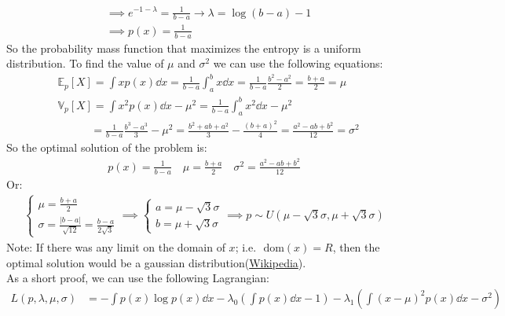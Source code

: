 \documentclass[12pt]{article}
\begin{document}
\begin{qsolve}[solution]
\begin{align*}
         & \implies e^{-1-\lambda}    = \frac{1}{b-a} \rightarrow \lambda =  \log(b-a) -1                \\
         & \implies p(x)  = \frac{1}{b-a}
    \end{align*}
    \splitqsolve
    So the probability mass function that maximizes the entropy is a uniform distribution. To find the value of $\mu$ and $\sigma^2$ we can use the following equations:
    \begin{align*}
         & \mathbb{E}_p [ X ]   = \int x p(x) \dd{x} = \frac{1}{b-a} \int_{a}^{b} x \dd{x} = \frac{1}{b-a} \frac{b^2 - a^2}{2} = \frac{b+a}{2} = \mu                  \\
         & \mathbb{V}_p [ X ] = \int x^2 p(x) \dd{x} - \mu^2 = \frac{1}{b-a} \int_{a}^{b} x^2 \dd{x} - \mu^2                                                          \\
         & \quad \quad \quad        = \frac{1}{b-a} \frac{b^3 - a^3}{3} - \mu^2 = \frac{b^2 + ab + a^2}{3} - \frac{(b+a)^2}{4} = \frac{a^2 - ab + b^2}{12} = \sigma^2
    \end{align*}
    So the optimal solution of the problem is:
    \begin{align*}
        p(x) = \frac{1}{b-a} \quad \mu = \frac{b+a}{2} \quad \sigma^2 = \frac{a^2 - ab + b^2}{12}
    \end{align*}
    Or:
    \begin{align*}
        \begin{cases}
            \mu    = \frac{b+a}{2} \\
            \sigma = \frac{\lvert b-a \rvert}{\sqrt{12}} = \frac{b-a}{2\sqrt{3}}
        \end{cases}
        \implies
        \begin{cases}
            a = \mu - \sqrt{3}\sigma \\
            b = \mu + \sqrt{3}\sigma
        \end{cases}
        \implies
        p \sim U(\mu - \sqrt{3}\sigma, \mu + \sqrt{3}\sigma)
    \end{align*}
    Note: If there was any limit on the domain of $x$; i.e. $\text{ dom}(x) = R $, then the optimal solution would be a gaussian distribution(\href{https://en.wikipedia.org/w/index.php?title=Maximum_entropy_probability_distribution&action=edit&section=11}{Wikipedia}).\\
    As a short proof, we can use the following Lagrangian:
    \begin{align*}
        L(p, \lambda, \mu, \sigma) & = - \int p(x) \log p(x) \dd{x} - \lambda_0 \left( \int p(x) \dd{x} - 1 \right) -\lambda_1 \left( \int (x-\mu)^2 p(x) \dd{x} - \sigma^2 \right) \\

\end{align*}
\end{qsolve}
\end{document}
